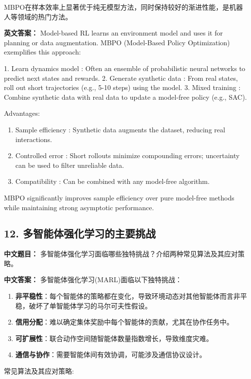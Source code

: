 \documentclass[10pt,a4paper]{ctexart}
\begin{document}
MBPO在样本效率上显著优于纯无模型方法，同时保持较好的渐进性能，是机器人等领域的热门方法。

\textbf{英文答案：}  
Model-based RL learns an environment model and uses it for planning or data augmentation. MBPO (Model-Based Policy Optimization) exemplifies this approach:

1.  Learn dynamics model : Often an ensemble of probabilistic neural networks to predict next states and rewards.
2.  Generate synthetic data : From real states, roll out short trajectories (e.g., 5-10 steps) using the model.
3.  Mixed training : Combine synthetic data with real data to update a model-free policy (e.g., SAC).

Advantages:
\begin{enumerate}
    \item Sample efficiency : Synthetic data augments the dataset, reducing real interactions.
    \item Controlled error : Short rollouts minimize compounding errors; uncertainty can be used to filter unreliable data.
    \item Compatibility : Can be combined with any model-free algorithm.
\end{enumerate}

MBPO significantly improves sample efficiency over pure model-free methods while maintaining strong asymptotic performance.

\subsection*{12. 多智能体强化学习的主要挑战}
\textbf{中文题目：} 多智能体强化学习面临哪些独特挑战？介绍两种常见算法及其应对策略。

\textbf{中文答案：}  
多智能体强化学习(MARL)面临以下独特挑战：
\begin{enumerate}
    \item \textbf{非平稳性}：每个智能体的策略都在变化，导致环境动态对其他智能体而言非平稳，破坏了单智能体学习的马尔可夫性假设。
    \item \textbf{信用分配}：难以确定集体奖励中每个智能体的贡献，尤其在协作任务中。
    \item \textbf{可扩展性}：联合动作空间随智能体数量指数增长，导致维度灾难。
    \item \textbf{通信与协作}：需要智能体间有效协调，可能涉及通信协议设计。
\end{enumerate}

 常见算法及其应对策略:
\end{document}
